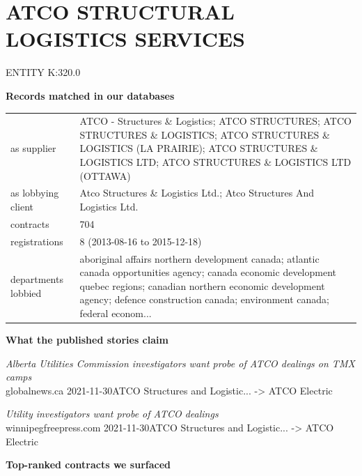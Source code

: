 \documentclass[11pt,a4paper]{article}
\newcommand{\lbl}[1]{{\color{slate}\ttfamily\footnotesize #1}}
\begin{document}
\section*{ATCO STRUCTURAL LOGISTICS SERVICES}
\lbl{ENTITY K:320.0}\quad\lbl{11 name variants}\par
\vspace{0.3em}\noindent\textbf{Records matched in our databases}\par
{\small\begin{tabular}{@{}p{3.1cm}p{13.0cm}@{}}
as supplier & ATCO - Structures \& Logistics; ATCO STRUCTURES; ATCO STRUCTURES \& LOGISTICS; ATCO STRUCTURES \& LOGISTICS (LA PRAIRIE); ATCO STRUCTURES \& LOGISTICS LTD; ATCO STRUCTURES \& LOGISTICS LTD (OTTAWA)\\
as lobbying client & Atco Structures \& Logistics Ltd.; Atco Structures And Logistics Ltd.\\
contracts & 704\\
registrations & 8 (2013-08-16 to 2015-12-18)\\
departments lobbied & aboriginal affairs northern development canada; atlantic canada opportunities agency; canada economic development quebec regions; canadian northern economic development agency; defence construction canada; environment canada; federal econom...\\
\end{tabular}}\par
\vspace{0.6em}\noindent\textbf{What the published stories claim}\par
{\small\textit{Alberta Utilities Commission investigators want probe of ATCO dealings on TMX camps}\\
\lbl{globalnews.ca 2021-11-30}\quad ATCO Structures and Logistic... -> ATCO Electric}\par\vspace{0.25em}
{\small\textit{Utility investigators want probe of ATCO dealings}\\
\lbl{winnipegfreepress.com 2021-11-30}\quad ATCO Structures and Logistic... -> ATCO Electric}\par\vspace{0.25em}
\vspace{0.6em}\noindent\textbf{Top-ranked contracts we surfaced}\par
\end{document}
